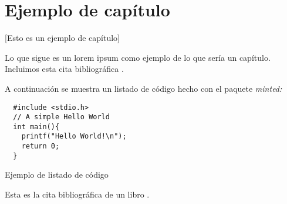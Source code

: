 \chapter{Ejemplo de capítulo}

[Esto es un ejemplo de capítulo]

Lo que sigue es un lorem ipsum como ejemplo de lo que sería un capítulo. Incluimos esta cita bibliográfica \cite{recomendaciones}.

\lipsum


A continuación se muestra un listado de código hecho con el paquete \emph{minted:}


\begin{code} %
\begin{verbatim}
  #include <stdio.h>
  // A simple Hello World
  int main(){
    printf("Hello World!\n");
    return 0;
  }
\end{verbatim}
\caption{Ejemplo de listado de código}
\end{code}

Esta es la cita bibliográfica de un libro \cite{ec}.

